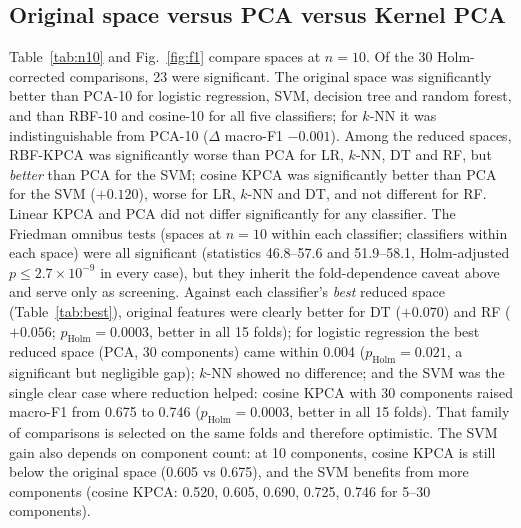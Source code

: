 \documentclass{ieeeaccess}
\newcommand{\tabsize}{\footnotesize}
\begin{document}
\subsection{Original space versus PCA versus Kernel PCA}
Table~\ref{tab:n10} and Fig.~\ref{fig:f1} compare spaces at $n=10$. Of the 30 Holm-corrected comparisons, 23 were significant. The original space was significantly better than PCA-10 for logistic regression, SVM, decision tree and random forest, and than RBF-10 and cosine-10 for all five classifiers; for $k$-NN it was indistinguishable from PCA-10 ($\Delta$ macro-F1 $-0.001$). Among the reduced spaces, RBF-KPCA was significantly worse than PCA for LR, $k$-NN, DT and RF, but \emph{better} than PCA for the SVM; cosine KPCA was significantly better than PCA for the SVM ($+0.120$), worse for LR, $k$-NN and DT, and not different for RF. Linear KPCA and PCA did not differ significantly for any classifier. The Friedman omnibus tests (spaces at $n=10$ within each classifier; classifiers within each space) were all significant (statistics 46.8--57.6 and 51.9--58.1, Holm-adjusted $p\le 2.7\times10^{-9}$ in every case), but they inherit the fold-dependence caveat above and serve only as screening. Against each classifier's \emph{best} reduced space (Table~\ref{tab:best}), original features were clearly better for DT ($+0.070$) and RF ($+0.056$; $p_\mathrm{Holm}=0.0003$, better in all 15 folds); for logistic regression the best reduced space (PCA, 30 components) came within 0.004 ($p_\mathrm{Holm}=0.021$, a significant but negligible gap); $k$-NN showed no difference; and the SVM was the single clear case where reduction helped: cosine KPCA with 30 components raised macro-F1 from 0.675 to 0.746 ($p_\mathrm{Holm}=0.0003$, better in all 15 folds). That family of comparisons is selected on the same folds and therefore optimistic. The SVM gain also depends on component count: at 10 components, cosine KPCA is still below the original space (0.605 vs 0.675), and the SVM benefits from more components (cosine KPCA: 0.520, 0.605, 0.690, 0.725, 0.746 for 5--30 components).

\begin{table}[t]
\caption{Accuracy / macro-F1 ($\pm$ std over 15 folds) at 10 components (original = 78 features), standard class weights.}\label{tab:n10}
\centering\tabsize
\resizebox{\textwidth}{!}{}
\end{table}

\begin{table}[t]
\caption{Original features versus each classifier's best reduced space (Wilcoxon, Holm-corrected). Positive $\Delta$: original better.}\label{tab:best}
\centering\tabsize
\resizebox{\columnwidth}{!}{}
\end{table}
\end{document}
